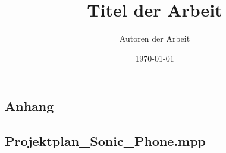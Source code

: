 \documentclass[hidelinks,12pt,a4paper, liststotoc, bibtotoc]{scrreprt}
\title{Titel der Arbeit}
\author{Autoren der Arbeit}
\date{\today}
\newcounter{pageNumberAfterContent}
\begin{document}





\tableofcontents





\clearpage

\setcounter{pageNumberAfterContent}{\value{page}}


\clearpage













\newpage
\printbibliography

\begin{appendices}	
  \chapter{Anhang}
  \section{Projektplan\_Sonic\_Phone.mpp} \label{AnhangA}
\end{appendices}
\end{document}
